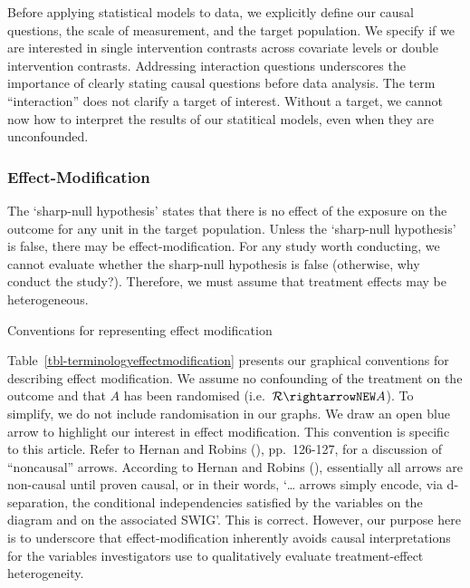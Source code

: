 \documentclass[
  single column]{article}
\begin{document}
Before applying statistical models to data, we explicitly define our
causal questions, the scale of measurement, and the target population.
We specify if we are interested in single intervention contrasts across
covariate levels or double intervention contrasts. Addressing
interaction questions underscores the importance of clearly stating
causal questions before data analysis. The term ``interaction'' does not
clarify a target of interest. Without a target, we cannot now how to
interpret the results of our statitical models, even when they are
unconfounded.

\subsubsection{Effect-Modification}\label{effect-modification}

The `sharp-null hypothesis' states that there is no effect of the
exposure on the outcome for any unit in the target population. Unless
the `sharp-null hypothesis' is false, there may be effect-modification.
For any study worth conducting, we cannot evaluate whether the
sharp-null hypothesis is false (otherwise, why conduct the study?).
Therefore, we must assume that treatment effects may be heterogeneous.

\begin{table}

\caption{\label{tbl-terminologyeffectmodification}Conventions for
representing effect modification}

\centering{

\terminologyeffectmodification

}

\end{table}%

Table~\ref{tbl-terminologyeffectmodification} presents our graphical
conventions for describing effect modification. We assume no confounding
of the treatment on the outcome and that \(A\) has been randomised
(i.e.~\(\mathcal{R} \rightarrowNEW A\)). To simplify, we do not include
randomisation in our graphs. We draw an open blue arrow to highlight our
interest in effect modification. This convention is specific to this
article. Refer to Hernan and Robins
(), pp.~126-127, for a discussion
of ``noncausal'' arrows. According to Hernan and Robins
(), essentially all arrows are
non-causal until proven causal, or in their words, `\ldots{} arrows
simply encode, via d-separation, the conditional independencies
satisfied by the variables on the diagram and on the associated SWIG'.
This is correct. However, our purpose here is to underscore that
effect-modification inherently avoids causal interpretations for the
variables investigators use to qualitatively evaluate treatment-effect
heterogeneity.
\end{document}

